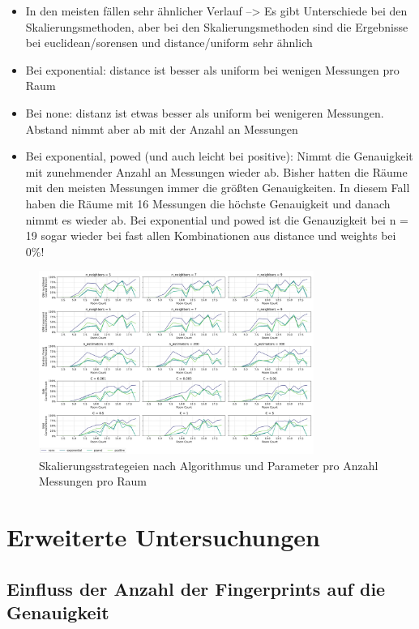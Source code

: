 \begin{itemize}
    \item In den meisten fällen sehr ähnlicher Verlauf --> Es gibt Unterschiede bei den Skalierungsmethoden, aber bei den Skalierungsmethoden sind die Ergebnisse bei euclidean/sorensen und distance/uniform sehr ähnlich
    \item Bei exponential: distance ist besser als uniform bei wenigen Messungen pro Raum
    \item Bei none: distanz ist etwas besser als uniform bei wenigeren Messungen. Abstand nimmt aber ab mit der Anzahl an Messungen
    \item Bei exponential, powed (und auch leicht bei positive): Nimmt die Genauigkeit mit zunehmender Anzahl an Messungen wieder ab. Bisher hatten die Räume mit den meisten Messungen immer die größten Genauigkeiten. In diesem Fall haben die Räume mit 16 Messungen die höchste Genauigkeit und danach nimmt es wieder ab. Bei exponential und powed ist die Genauzigkeit bei n = 19 sogar wieder bei fast allen Kombinationen aus distance und weights bei 0\%!
\end{itemize}

\begin{figure}[H]
    \centering
    \includegraphics[width=0.8\textwidth]{images/7_value_scaling_strategy_02.png}
    \caption{Skalierungsstrategeien nach Algorithmus und Parameter pro Anzahl Messungen pro Raum}
    \label{fig:7_value_scaling_strategy_02}
\end{figure}

\section{Erweiterte Untersuchungen}

\subsection{Einfluss der Anzahl der Fingerprints auf die Genauigkeit}

